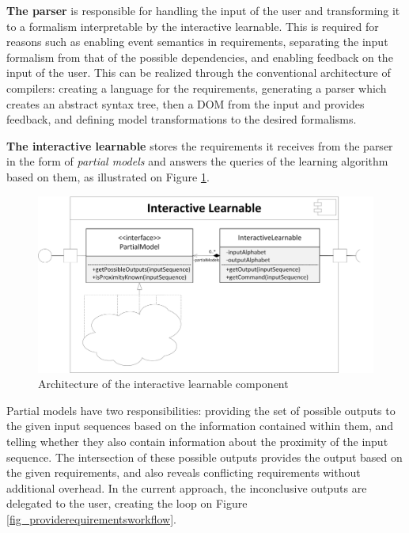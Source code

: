 \textbf{The parser} is responsible for handling the input of the user and transforming it to a formalism interpretable by the interactive learnable. This is required for reasons such as enabling event semantics in requirements, separating the input formalism from that of the possible dependencies, and enabling feedback on the input of the user. This can be realized through the conventional architecture of compilers: creating a language for the requirements, generating a parser which creates an abstract syntax tree, then a DOM from the input and provides feedback, and defining model transformations to the desired formalisms.

\textbf{The interactive learnable} stores the requirements it receives from the parser in the form of \textit{partial models} and answers the queries of the learning algorithm based on them, as illustrated on Figure \ref{fig_architcture_interactivelearnable}.

\begin{figure}[!ht] 
	\centering
	\includegraphics[width=150mm, keepaspectratio]{figures/architecture_interactivelearnable.png}
	\caption{Architecture of the interactive learnable component} 
	\label{fig_architcture_interactivelearnable}
\end{figure}

Partial models have two responsibilities: providing the set of possible outputs to the given input sequences based on the information contained within them, and telling whether they also contain information about the proximity of the input sequence. The intersection of these possible outputs provides the output based on the given requirements, and also reveals conflicting requirements without additional overhead. In the current approach, the inconclusive outputs are delegated to the user, creating the loop on Figure \ref{fig_providerequirementsworkflow}.

